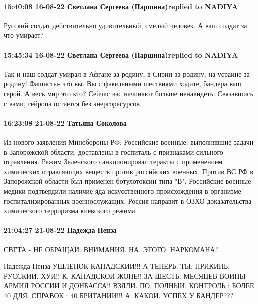  
 
 
 
 


\paragraph{15:40:08 16-08-22 Светлана Сергеева (Паршина)replied to NADIYA}

Русский солдат действительно удивительный, смелый человек. А ваш солдат за что умирает?


\paragraph{15:45:34 16-08-22 Светлана Сергеева (Паршина)replied to NADIYA}

Так и наш солдат умирал в Афгане за родину, в Сирии за родину, на усраине за
родину! Фашисты- это вы. Вы с факельными шествиями ходите, бандера ваш герой. А
весь мир это кто? Сейчас вас начинают больше ненавидеть. Связавшись с вами,
гейропа остается без энергоресурсов.

\paragraph{16:23:08 21-08-22 Татьяна Соколова}

Из нового заявления Минобороны РФ:
Российские военные, выполнявшие задачи в Запорожской области, доставлены в госпиталь с признаками сильного отравления. Режим Зеленского санкционировал теракты с применением химических отравляющих веществ против российских военных. Против ВС РФ в Запорожской области был применен ботулотоксин типа "В".
Российские военные медики подтвердили наличие яда искусственного происхождения в организме госпитализированных военнослужащих. Россия направит в ОЗХО доказательства химического терроризма киевского режима.

\paragraph{21:04:27 21-08-22 Надежда Пенза}

СВЕТА - НЕ ОБРАЩАИ. ВНИМАНИЯ. НА. ЭТОГО. НАРКОМАНА!!

Надежда Пенза
УШЛЕПОК КАНАДСКИИ!!!
А ТЕПЕРЬ. ТЫ. ПРИКИНЬ. РУССКИИ. ХУИ!!
К. КАНАДСКОИ ЖОПЕ!!
ЗА ШЕСТЬ. МЕСЯЦЕВ ВОИНЫ -
АРМИЯ РОССИИ И ДОНБАССА!!
ВЗЯЛИ. ПО. ПОЛНЫИ. КОНТРОЛЬ :
БОЛЕЕ 40 %
ДЛЯ. СПРАВОК :
40 %
БРИТАНИИ!!!
А. КАКОИ. УСПЕХ У БАНДЕР???
